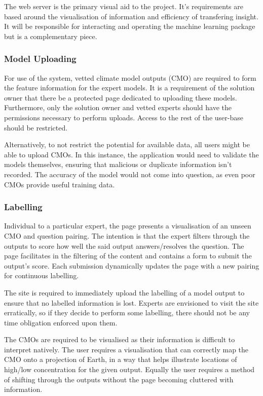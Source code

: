 \documentclass{ecmm427_assignment}
\begin{document}
The web server is the primary visual aid to the project. It's requirements are based around the visualisation of information and efficiency of transfering insight. It will be responsible for interacting and operating the machine learning package but is a complementary piece.

\subsubsection{Model Uploading}

 For use of the system, vetted climate model outputs (CMO) are required to form the feature information for the expert models. It is a requirement of the solution owner that there be a protected page dedicated to uploading these models. Furthermore, only the solution owner and vetted experts should have the permissions necessary to perform uploads. Access to the rest of the user-base should be restricted.

  Alternatively, to not restrict the potential for available data, all users might be able to upload CMOs. In this instance, the application would need to validate the models themselves, ensuring that malicious or duplicate information isn't recorded. The accuracy of the model would not come into question, as even poor CMOs provide useful training data.

\subsubsection{Labelling}

 Individual to a particular expert, the page presents a visualisation of an unseen CMO and question pairing. The intention is that the expert filters through the outputs to score how well the said output answers/resolves the question. The page facilitates in the filtering of the content and contains a form to submit the output's score. Each submission dynamically updates the page with a new pairing for continuous labelling.

 The site is required to immediately upload the labelling of a model output to ensure that no labelled information is lost. Experts are envisioned to visit the site erratically, so if they decide to perform some labelling, there should not be any time obligation enforced upon them.

 The CMOs are required to be visualised as their information is difficult to interpret natively. The user requires a visualisation that can correctly map the CMO onto a projection of Earth, in a way that helps illustrate locations of high/low concentration for the given output. Equally the user requires a method of shifting through the outputs without the page becoming cluttered with information.
\end{document}
